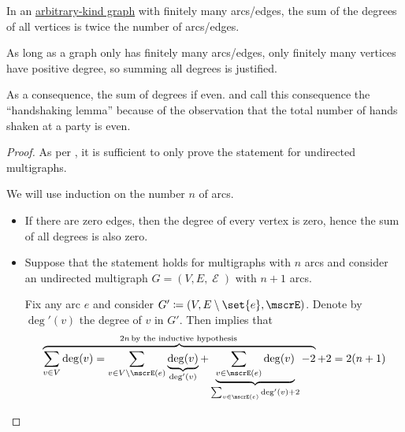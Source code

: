 \begin{proposition}\label{thm:sum_of_graph_degrees}
  In an \hyperref[rem:arbitrary_kind_graph]{arbitrary-kind graph} with finitely many arcs/edges, the sum of the degrees of all vertices is twice the number of arcs/edges.
\end{proposition}
\begin{comments}
  \item As long as a graph only has finitely many arcs/edges, only finitely many vertices have positive degree, so summing all degrees is justified.
  \item As a consequence, the sum of degrees if even.  and  call this consequence the \enquote{handshaking lemma} because of the observation that the total number of hands shaken at a party is even.
\end{comments}
\begin{proof}
  As per , it is sufficient to only prove the statement for undirected multigraphs.

  We will use induction on the number \( n \) of arcs.

  \begin{itemize}
    \item If there are zero edges, then the degree of every vertex is zero, hence the sum of all degrees is also zero.

    \item Suppose that the statement holds for multigraphs with \( n \) arcs and consider an undirected multigraph \( G = (V, E, \mscrE) \) with \( n + 1 \) arcs.

    Fix any arc \( e \) and consider \( G' \coloneqq (V, E \setminus \set{ e }, \mscrE) \). Denote by \( \deg'(v) \) the degree of \( v \) in \( G' \). Then  implies that
    \begin{equation*}
      \overbrace{\sum_{v \in V} \deg(v) = \sum_{v \in V \setminus \mscrE(e)} \underbrace{\deg(v)}_{\deg'(v)} + \underbrace{\sum_{v \in \mscrE(e)} \deg(v)}_{\sum_{v \in \mscrE(e)} \deg'(v) + 2} - 2}^{2n \T*{by the inductive hypothesis}} + 2
      =
      2(n + 1)
    \end{equation*}
  \end{itemize}
\end{proof}

